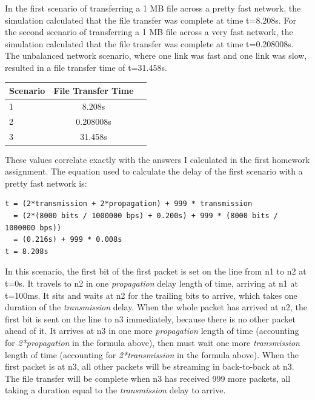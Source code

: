 \documentclass[11pt]{article}
\begin{document}
In the first scenario of transferring a 1 MB file across a pretty fast network, the simulation calculated that the file transfer was complete at time t=8.208s. For the second scenario of transferring a 1 MB file across a very fast network, the simulation calculated that the file transfer was complete at time t=0.208008s. The unbalanced network scenario, where one link was fast and one link was slow, resulted in a file transfer time of t=31.458s.

\vspace{0.5cm}
\begin{absolutelynopagebreak}
\begin{tabular}{lcc}
  \toprule
  Scenario & File Transfer Time\\
  \midrule
  1 & 8.208s \\
  2 & 0.208008s \\
  3 & 31.458s \\
  \bottomrule
\end{tabular}
\end{absolutelynopagebreak}
\vspace{0.5cm}

These values correlate exactly with the answers I calculated in the first homework assignment. The equation used to calculate the delay of the first scenario with a pretty fast network is:

\vspace{5mm}
\begin{absolutelynopagebreak}
\begin{lstlisting}
t = (2*transmission + 2*propagation) + 999 * transmission
  = (2*(8000 bits / 1000000 bps) + 0.200s) + 999 * (8000 bits / 1000000 bps))
  = (0.216s) + 999 * 0.008s
t = 8.208s
\end{lstlisting}
\end{absolutelynopagebreak}
\vspace{5mm}

In this scenario, the first bit of the first packet is set on the line from n1 to n2 at t=0s. It travels to n2 in one \emph{propagation} delay length of time, arriving at n1 at t=100ms. It sits and waits at n2 for the trailing bits to arrive, which takes one duration of the \emph{transmission} delay. When the whole packet has arrived at n2, the first bit is sent on the line to n3 immediately, because there is no other packet ahead of it. It arrives at n3 in one more \emph{propagation} length of time (accounting for \emph{2*propagation} in the formula above), then must wait one more \emph{transmission} length of time (accounting for \emph{2*transmission} in the formula above). When the first packet is at n3, all other packets will be streaming in back-to-back at n3. The file transfer will be complete when n3 has received 999 more packets, all taking a duration equal to the \emph{transmission} delay to arrive.
\end{document}
